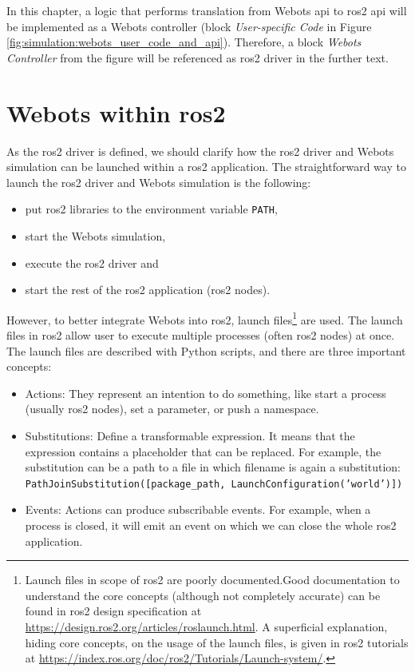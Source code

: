 In this chapter, a logic that performs translation from Webots \ac{api} to \ac{ros2} \ac{api} will be implemented as a Webots controller (block \textit{User-specific Code} in Figure \ref{fig:simulation:webots_user_code_and_api}).
Therefore, a block \textit{Webots Controller} from the figure will be referenced as \ac{ros2} driver in the further text.

\section{Webots within \ac{ros2}}
As the \ac{ros2} driver is defined, we should clarify how the \ac{ros2} driver and Webots simulation can be launched within a \ac{ros2} application. 
The straightforward way to launch the \ac{ros2} driver and Webots simulation is the following:
\begin{itemize}
    \item put \ac{ros2} libraries to the environment variable \texttt{PATH},
    \item start the Webots simulation,
    \item execute the \ac{ros2} driver and
    \item start the rest of the \ac{ros2} application (\ac{ros2} nodes).
\end{itemize}

However, to better integrate Webots into \ac{ros2}, launch files\footnote{Launch files in scope of \ac{ros2} are poorly documented.Good documentation to understand the core concepts (although not completely accurate) can be found in \ac{ros2} design specification at \url{https://design.ros2.org/articles/roslaunch.html}. A superficial explanation, hiding core concepts, on the usage of the launch files, is given in \ac{ros2} tutorials at \url{https://index.ros.org/doc/ros2/Tutorials/Launch-system/}.} are used.
The launch files in \ac{ros2} allow user to execute multiple processes (often \ac{ros2} nodes) at once.
The launch files are described with Python scripts, and there are three important concepts:
\begin{itemize}
    \item Actions: They represent an intention to do something, like start a process (usually \ac{ros2} nodes), set a parameter, or push a namespace. 
    \item Substitutions: Define a transformable expression. 
    It means that the expression contains a placeholder that can be replaced.
    For example, the substitution can be a path to a file in which filename is again a substitution: \\ \texttt{PathJoinSubstitution([package\_path, LaunchConfiguration('world')])}
    \item Events: Actions can produce subscribable events.
    For example, when a process is closed, it will emit an event on which we can close the whole \ac{ros2} application.
\end{itemize}

